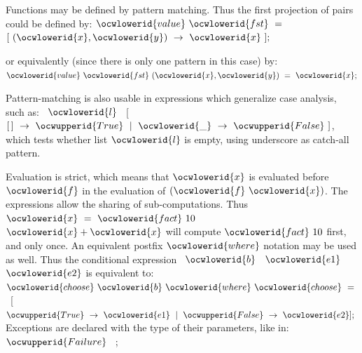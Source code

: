 \documentclass[12pt]{article}
\begin{document}
\ocwendcode{}\ocwindent{0.00em}
Functions may be defined by pattern matching. Thus the first projection of
pairs could be defined by: 
\ocweol
\label{../ML/pidgin.ml:2274}%
\medskip
\ocwbegincode{}\ocwindent{0.00em}
$\ocwlowerid{value}~\ocwlowerid{fst}~=~$~$[~(\ocwlowerid{x},\ocwlowerid{y})~\rightarrow{}~\ocwlowerid{x}~];$\medskip

\ocwendcode{}\ocwindent{0.00em}
or equivalently (since there is only one pattern in this case) by: 
\ocweol
\label{../ML/pidgin.ml:2380}%
\medskip
\ocwbegincode{}\ocwindent{0.00em}
$\ocwlowerid{value}~\ocwlowerid{fst}~(\ocwlowerid{x},\ocwlowerid{y})~=~\ocwlowerid{x};$\medskip

\ocwendcode{}\ocwindent{0.00em}
Pattern-matching is also usable in \ocwbegindcode{}\ocwenddcode{} expressions which generalize
case analysis,
such as: \ocwbegindcode{}~$\ocwlowerid{l}~$~[~$[\,]~\rightarrow{}~\ocwupperid{True}~\mid{}~\ocwlowerid{\_}~\rightarrow{}~\ocwupperid{False}~]$\ocwenddcode{}, which
tests whether list \ocwbegindcode{}$\ocwlowerid{l}$\ocwenddcode{} is empty, using underscore as catch-all
pattern.

Evaluation is strict, which means that \ocwbegindcode{}$\ocwlowerid{x}$\ocwenddcode{} is evaluated before
\ocwbegindcode{}$\ocwlowerid{f}$\ocwenddcode{} in the evaluation of \ocwbegindcode{}$(\ocwlowerid{f}~\ocwlowerid{x})$\ocwenddcode{}. The \ocwbegindcode{}\ocwenddcode{} expressions allow the
sharing of sub-computations. Thus
\ocwbegindcode{}~$\ocwlowerid{x}~=~\ocwlowerid{fact}~10~$~$\ocwlowerid{x}+\ocwlowerid{x}$\ocwenddcode{} will compute \ocwbegindcode{}$\ocwlowerid{fact}~10$\ocwenddcode{} first, 
and only once. 
An equivalent postfix \ocwbegindcode{}$\ocwlowerid{where}$\ocwenddcode{} notation may be used as well. Thus
the conditional expression \ocwbegindcode{}~$\ocwlowerid{b}~$~$\ocwlowerid{e1}~$~$\ocwlowerid{e2}$\ocwenddcode{} is equivalent to: 
\ocweol
\ocwindent{0.00em}
\ocwbegindcode{}~$\ocwlowerid{choose}~\ocwlowerid{b}~\ocwlowerid{where}~\ocwlowerid{choose}~=~$~[~$\ocwupperid{True}~\rightarrow{}~\ocwlowerid{e1}~\mid{}~\ocwupperid{False}~\rightarrow{}~\ocwlowerid{e2}];~$\ocwenddcode{} 
\ocweol
\ocwindent{0.00em}
Exceptions are declared with the type of their parameters, like in: 
\ocweol
\label{../ML/pidgin.ml:3138}%
\medskip
\ocwbegincode{}\ocwindent{0.00em}
~$\ocwupperid{Failure}~$~;\medskip
\end{document}
